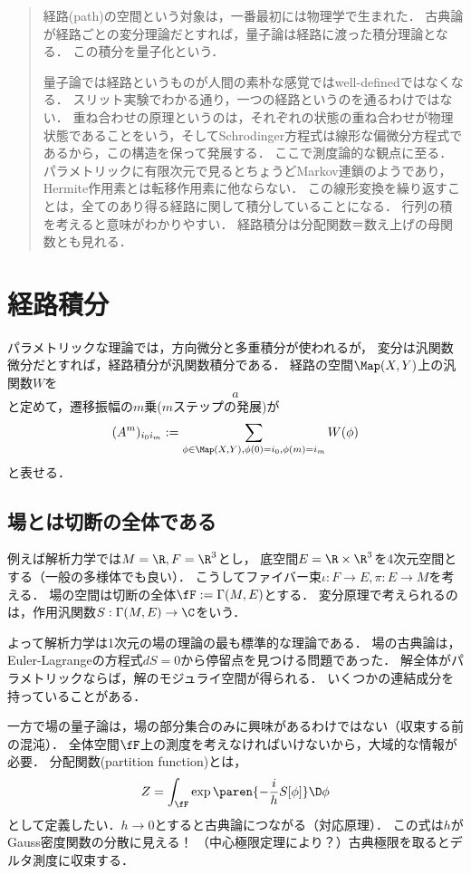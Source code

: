 \documentclass[uplatex,dvipdfmx]{jsreport}
\begin{document}
\begin{quotation}
    経路(path)の空間という対象は，一番最初には物理学で生まれた．
    古典論が経路ごとの変分理論だとすれば，量子論は経路に渡った積分理論となる．
    この積分を量子化という．

    量子論では経路というものが人間の素朴な感覚ではwell-definedではなくなる．
    スリット実験でわかる通り，一つの経路というのを通るわけではない．
    重ね合わせの原理というのは，それぞれの状態の重ね合わせが物理状態であることをいう，そしてSchrodinger方程式は線形な偏微分方程式であるから，この構造を保って発展する．
    ここで測度論的な観点に至る．
    パラメトリックに有限次元で見るとちょうどMarkov連鎖のようであり，Hermite作用素とは転移作用素に他ならない．
    この線形変換を繰り返すことは，全てのあり得る経路に関して積分していることになる．
    行列の積を考えると意味がわかりやすい．
    経路積分は分配関数＝数え上げの母関数とも見れる．
\end{quotation}

\section{経路積分}

パラメトリックな理論では，方向微分と多重積分が使われるが，
変分は汎関数微分だとすれば，経路積分が汎関数積分である．
経路の空間$\Map(X,Y)$上の汎関数$W$を
\[a\]
と定めて，遷移振幅の$m$乗($m$ステップの発展)が
\[(A^m)_{i_0i_m}:=\sum_{\phi\in\Map(X,Y),\phi(0)=i_0,\phi(m)=i_m}W(\phi)\]
と表せる．

\subsection{場とは切断の全体である}

例えば解析力学では$M=\R,F=\R^3$とし，
底空間$E=\R\times\R^3$を4次元空間とする（一般の多様体でも良い）．
こうしてファイバー束$\iota:F\to E,\pi:E\to M$を考える．
場の空間は切断の全体$\fF:=\Gamma(M,E)$とする．
変分原理で考えられるのは，作用汎関数$S:\Gamma(M,E)\to\C$をいう．

よって解析力学は1次元の場の理論の最も標準的な理論である．
場の古典論は，Euler-Lagrangeの方程式$dS=0$から停留点を見つける問題であった．
解全体がパラメトリックならば，解のモジュライ空間が得られる．
いくつかの連結成分を持っていることがある．

一方で場の量子論は，場の部分集合のみに興味があるわけではない（収束する前の混沌）．
全体空間$\fF$上の測度を考えなければいけないから，大域的な情報が必要．
分配関数(partition function)とは，
\[Z=\int_{\fF}\exp\paren{-\frac{i}{h}S[\phi]}\D\phi\]
として定義したい．$h\to0$とすると古典論につながる（対応原理）．
この式は$h$がGauss密度関数の分散に見える！
（中心極限定理により？）古典極限を取るとデルタ測度に収束する．
\end{document}
